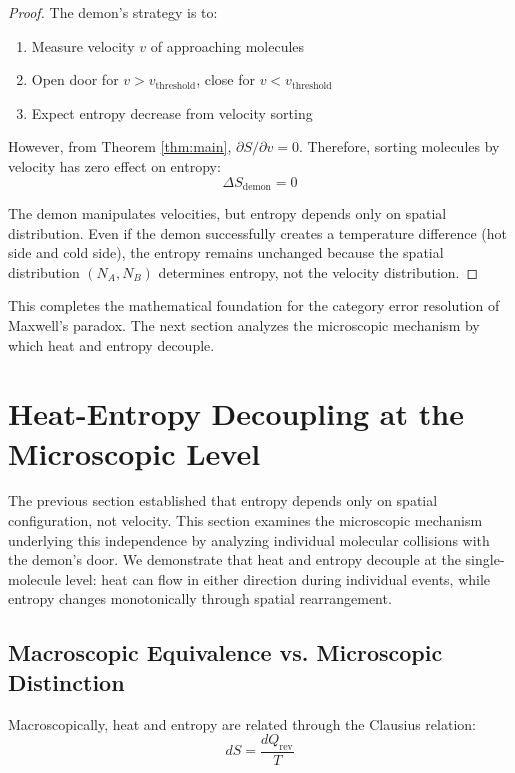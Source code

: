 \documentclass[10pt,twocolumn,letterpaper]{article}
\theoremstyle{definition}
\theoremstyle{remark}
\begin{document}
\begin{proof}
The demon's strategy is to:
\begin{enumerate}
\item Measure velocity $v$ of approaching molecules
\item Open door for $v > v_{\text{threshold}}$, close for $v < v_{\text{threshold}}$
\item Expect entropy decrease from velocity sorting
\end{enumerate}

However, from Theorem \ref{thm:main}, $\partial S/\partial v = 0$. Therefore, sorting molecules by velocity has zero effect on entropy:
\begin{equation}
\Delta S_{\text{demon}} = 0
\end{equation}

The demon manipulates velocities, but entropy depends only on spatial distribution. Even if the demon successfully creates a temperature difference (hot side and cold side), the entropy remains unchanged because the spatial distribution $(N_A, N_B)$ determines entropy, not the velocity distribution.
\end{proof}

This completes the mathematical foundation for the category error resolution of Maxwell's paradox. The next section analyzes the microscopic mechanism by which heat and entropy decouple.

\section{Heat-Entropy Decoupling at the Microscopic Level}
\label{sec:decoupling}

The previous section established that entropy depends only on spatial configuration, not velocity. This section examines the microscopic mechanism underlying this independence by analyzing individual molecular collisions with the demon's door. We demonstrate that heat and entropy decouple at the single-molecule level: heat can flow in either direction during individual events, while entropy changes monotonically through spatial rearrangement.

\subsection{Macroscopic Equivalence vs. Microscopic Distinction}

Macroscopically, heat and entropy are related through the Clausius relation:
\begin{equation}
dS = \frac{dQ_{\text{rev}}}{T}
\label{eq:clausius}
\end{equation}
\end{document}

